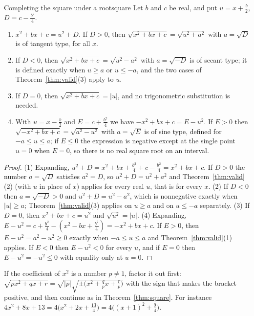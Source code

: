 \documentclass[11pt]{article}
\begin{document}
\begin{thm}{Completing the square under a root}{square}
Let $b$ and $c$ be real, and put $u=x+\frac b2$, $D=c-\frac{b^2}4$.
\begin{enumerate}[label=(\arabic*)]
  \item $x^2+bx+c=u^2+D$. If $D>0$, then $\sqrt{x^2+bx+c}=\sqrt{u^2+a^2}$ with $a=\sqrt D$ is of tangent type, for all $x$.
  \item If $D<0$, then $\sqrt{x^2+bx+c}=\sqrt{u^2-a^2}$ with $a=\sqrt{-D}$ is of secant type; it is defined exactly when $u\ge a$ or $u\le-a$, and the two cases of Theorem~\ref{thm:valid}(3) apply to $u$.
  \item If $D=0$, then $\sqrt{x^2+bx+c}=\lvert u\rvert$, and no trigonometric substitution is needed.
  \item With $u=x-\frac b2$ and $E=c+\frac{b^2}4$ we have $-x^2+bx+c=E-u^2$. If $E>0$ then $\sqrt{-x^2+bx+c}=\sqrt{a^2-u^2}$ with $a=\sqrt E$ is of sine type, defined for $-a\le u\le a$; if $E\le0$ the expression is negative except at the single point $u=0$ when $E=0$, so there is no real square root on an interval.
\end{enumerate}
\end{thm}
\begin{proof}
(1) Expanding, $u^2+D=x^2+bx+\frac{b^2}4+c-\frac{b^2}4=x^2+bx+c$. If $D>0$ the number $a=\sqrt D$ satisfies $a^2=D$, so $u^2+D=u^2+a^2$ and Theorem~\ref{thm:valid}(2) (with $u$ in place of $x$) applies for every real $u$, that is for every $x$. (2) If $D<0$ then $a=\sqrt{-D}>0$ and $u^2+D=u^2-a^2$, which is nonnegative exactly when $\lvert u\rvert\ge a$; Theorem~\ref{thm:valid}(3) applies on $u\ge a$ and on $u\le-a$ separately. (3) If $D=0$, then $x^2+bx+c=u^2$ and $\sqrt{u^2}=\lvert u\rvert$. (4) Expanding, $E-u^2=c+\frac{b^2}4-\left(x^2-bx+\frac{b^2}4\right)=-x^2+bx+c$. If $E>0$, then $E-u^2=a^2-u^2\ge0$ exactly when $-a\le u\le a$ and Theorem~\ref{thm:valid}(1) applies. If $E<0$ then $E-u^2<0$ for every $u$, and if $E=0$ then $E-u^2=-u^2\le0$ with equality only at $u=0$.
\end{proof}

If the coefficient of $x^2$ is a number $p\ne1$, factor it out first: $\sqrt{px^2+qx+r}=\sqrt{\lvert p\rvert}\sqrt{\pm\big(x^2+\frac qpx+\frac rp\big)}$ with the sign that makes the bracket positive, and then continue as in Theorem~\ref{thm:square}. For instance $4x^2+8x+13=4\big(x^2+2x+\frac{13}4\big)=4\big((x+1)^2+\frac94\big)$.
\end{document}
